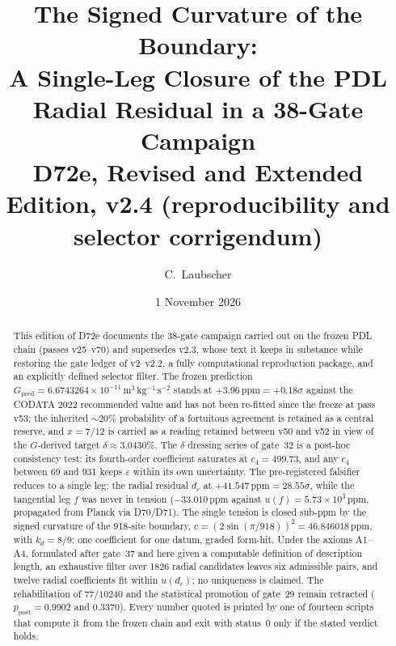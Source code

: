 \documentclass[11pt,a4paper]{article}
\title{The Signed Curvature of the Boundary:\\ A Single-Leg Closure of the PDL Radial Residual in a 38-Gate Campaign\\ \large D72e, Revised and Extended Edition, v2.4 (reproducibility and selector corrigendum)}
\author{C.~Laubscher}
\date{1 November 2026}
\newcommand{\ppm}{\ensuremath{\,\mathrm{ppm}}}
\begin{document}
\maketitle

\begin{abstract}\noindent
This edition of D72e documents the 38-gate campaign carried out on the frozen PDL chain (passes v25--v70) and supersedes v2.3, whose text it keeps in substance while restoring the gate ledger of v2--v2.2, a fully computational reproduction package, and an explicitly defined selector filter. The frozen prediction $G_{\mathrm{pred}} = 6.6743264\times10^{-11}\,\mathrm{m^3\,kg^{-1}\,s^{-2}}$ stands at $+3.96\ppm = +0.18\sigma$ against the CODATA 2022 recommended value and has not been re-fitted since the freeze at pass v53; the inherited $\sim 20\%$ probability of a fortuitous agreement is retained as a central reserve, and $x = 7/12$ is carried as a reading retained between v50 and v52 in view of the $G$-derived target $\delta \approx 3.0430\%$. The $\delta$ dressing series of gate~32 is a post-hoc consistency test: its fourth-order coefficient saturates at $c_4 = 499.73$, and any $c_4$ between 69 and 931 keeps $\varepsilon$ within its own uncertainty. The pre-registered falsifier reduces to a single leg: the radial residual $d_r$ at $+41.547\ppm = 28.55\sigma$, while the tangential leg $f$ was never in tension ($-33.010\ppm$ against $u(f) = 5.73\times10^{3}\ppm$, propagated from Planck via D70/D71). The single tension is closed sub-ppm by the signed curvature of the 918-site boundary, $c = (2\sin(\pi/918))^2 = 46.846018\ppm$, with $k_d = 8/9$: one coefficient for one datum, graded form-hit. Under the axioms A1--A4, formulated after gate~37 and here given a computable definition of description length, an exhaustive filter over 1826 radial candidates leaves six admissible pairs, and twelve radial coefficients fit within $u(d_r)$; no uniqueness is claimed. The rehabilitation of $77/10240$ and the statistical promotion of gate~29 remain retracted ($p_{\mathrm{post}} = 0.9902$ and $0.3370$). Every number quoted is printed by one of fourteen scripts that compute it from the frozen chain and exit with status~0 only if the stated verdict holds.
\end{abstract}
\end{document}
